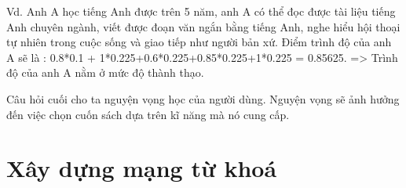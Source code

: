 Vd. Anh A học tiếng Anh được trên 5 năm, anh A có thể đọc được tài liệu tiếng Anh chuyên ngành, viết được đoạn văn ngắn bằng tiếng Anh, nghe hiểu hội thoại tự nhiên trong cuộc sống và giao tiếp như người bản xứ. Điểm trình độ của anh A sẽ là : 0.8*0.1 + 1*0.225+0.6*0.225+0.85*0.225+1*0.225 = 0.85625. => Trình độ của anh A nằm ở mức độ thành thạo.

Câu hỏi cuối cho ta nguyện vọng học của người dùng. Nguyện vọng sẽ ảnh hưởng đến việc chọn cuốn sách dựa trên kĩ năng mà nó cung cấp.
\section{Xây dựng mạng từ khoá}


